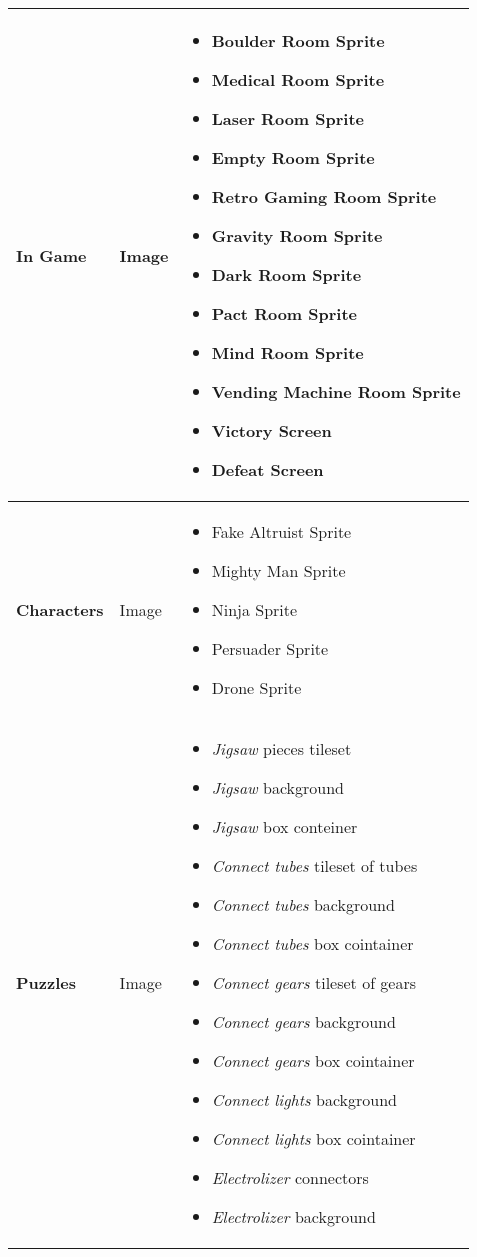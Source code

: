 \pagebreak
\begin{tabular}{|m{3cm}|m{3cm}|m{7cm}|}
	\hline
	\textbf{In Game}& Image & 
	\begin{itemize}
     	\item Boulder Room Sprite
     	\item Medical Room Sprite
     	\item Laser Room Sprite
     	\item Empty Room Sprite
     	\item Retro Gaming Room Sprite
     	\item Gravity Room Sprite
     	\item Dark Room Sprite
     	\item Pact Room Sprite
     	\item Mind Room Sprite
     	\item Vending Machine Room Sprite
     	\item Victory Screen
     	\item Defeat Screen
     \end{itemize}
     \\
     \hline
     \textbf{Characters}& Image & 
     \begin{itemize}
     	\item Fake Altruist Sprite
     	\item Mighty Man Sprite
     	\item Ninja Sprite
     	\item Persuader Sprite
     	\item Drone Sprite
     \end{itemize}
	 \\
     \hline
     \textbf{Puzzles}& Image & 
     \begin{itemize}
     	\item \textit{Jigsaw} pieces tileset
     	\item \textit{Jigsaw} background
     	\item \textit{Jigsaw} box conteiner
		\item \textit{Connect tubes} tileset of tubes
     	\item \textit{Connect tubes} background
     	\item \textit{Connect tubes} box cointainer
		\item \textit{Connect gears} tileset of gears
     	\item \textit{Connect gears} background
     	\item \textit{Connect gears} box cointainer
     	\item \textit{Connect lights} background
     	\item \textit{Connect lights} box cointainer
     	\item \textit{Electrolizer} connectors
     	\item \textit{Electrolizer} background
	\end{itemize}
	\\
	\hline
\end{tabular}
\pagebreak
	
